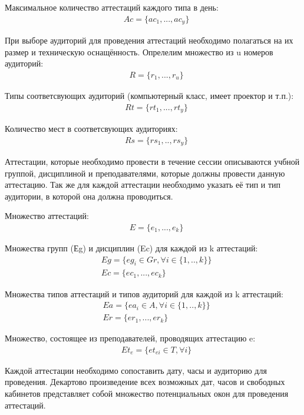 Максимальное количество аттестаций каждого типа в день:
\begin{align}
	& Ac =  \{ac_1,...,ac_y\} 
\end{align}

При выборе аудиторий для проведения аттестаций необходимо полагаться на их размер и техническую оснащённость. Опрелелим множество из u номеров аудиторий:
\begin{align}
	& R =  \{r_1,...,r_u\} 
\end{align}

Типы соответсвующих аудиторий (компьютерный класс, имеет проектор и т.п.):
\begin{align}
	& Rt =  \{rt_1,...,rt_y\} 
\end{align}

Количество мест в соответсвующих аудиториях:
\begin{align}
	& Rs =  \{rs_1,..,rs_y\} 
\end{align}

Аттестации, которые необходимо провести в течение сессии описываются учбной группой, дисциплиной и преподавателями, которые должны провести данную аттестацию. Так же для каждой аттестации необходимо указать её тип и тип аудитории, в которой она должна проводиться.

Множество аттестаций:
\begin{align}
	& {E} =  \{ e_1,...,e_k\}
\end{align}

Множества групп (Еg) и дисциплин (Ec) для каждой из k аттестаций:
\begin{align}
	& Eg =  \{ eg_i\in{}Gr , \forall  i \in{} \{1,..,k\} \} \\ 
	& {Ec} =  \{ ec_1,...,ec_k\}
\end{align}

Множества типов аттестаций и типов аудиторий для каждой из k аттестаций:
\begin{align}
	& Ea =  \{ ea_i\in{}A , \forall  i \in{} \{1,..,k\} \} \\ 
	& Er =  \{ er_1,...,er_k\}
\end{align}

Множество, состоящее из преподавателей, проводящих аттестацию e:
\begin{align}
	& Et_e =  \{ et_{ei}\in{}T , \forall  i \}
\end{align}

Каждой аттестации необходимо сопоставить дату, часы и аудиторию для проведения. Декартово произведение всех возможных дат, часов и свободных кабинетов представляет собой множество потенциальных окон для проведения аттестаций.

